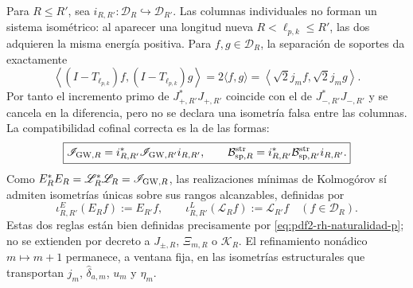Para \(R\leq R'\), sea
\(i_{R,R'}:\mathcal D_R\hookrightarrow\mathcal D_{R'}\). Las columnas
individuales no forman un sistema isométrico: al aparecer una longitud nueva
\(R<\ell_{p,k}\leq R'\), las dos adquieren la misma energía positiva. Para
\(f,g\in\mathcal D_R\), la separación de soportes da exactamente
\begin{equation}\label{eq:pdf2-rh-naturalidad}
 \left\langle(I-T_{\ell_{p,k}})f,
                    (I-T_{\ell_{p,k}})g\right\rangle
 =2\langle f,g\rangle
 =\left\langle\sqrt2j_mf,\sqrt2j_mg\right\rangle .
\end{equation}
Por tanto el incremento primo de
\(J_{+,R'}^*J_{+,R'}\) coincide con el de
\(J_{-,R'}^*J_{-,R'}\) y se cancela en la diferencia, pero no se declara una
isometría falsa entre las columnas. La compatibilidad cofinal correcta es la
de las formas:
\begin{equation}\label{eq:pdf2-rh-naturalidad-p}
 \boxed{
 \mathscr I_{{\rm GW},R}
 =i_{R,R'}^*\mathscr I_{{\rm GW},R'}i_{R,R'},
 \qquad
 \mathcal B_{{\rm sp},R}^{\rm str}
 =i_{R,R'}^*\mathcal B_{{\rm sp},R'}^{\rm str}i_{R,R'}.}
\end{equation}
Como \(E_R^*E_R=\mathscr L_R^*\mathscr L_R=\mathscr I_{{\rm GW},R}\), las
realizaciones mínimas de Kolmogórov sí admiten isometrías únicas sobre sus
rangos alcanzables, definidas por
\begin{equation}\label{eq:pdf2-rh-naturalidad-bw}
 \iota_{R,R'}^E(E_Rf):=E_{R'}f,
 \qquad
 \iota_{R,R'}^L(\mathscr L_Rf):=\mathscr L_{R'}f
 \quad(f\in\mathcal D_R).
\end{equation}
Estas dos reglas están bien definidas precisamente por
\eqref{eq:pdf2-rh-naturalidad-p}; no se extienden por decreto a
\(J_{\pm,R}\), \(\Xi_{m,R}\) o \(\mathcal K_R\). El refinamiento nonádico
\(m\mapsto m+1\) permanece, a ventana fija, en las isometrías estructurales
que transportan \(j_m\), \(\widehat\delta_{a,m}\), \(u_m\) y \(\eta_m\).

